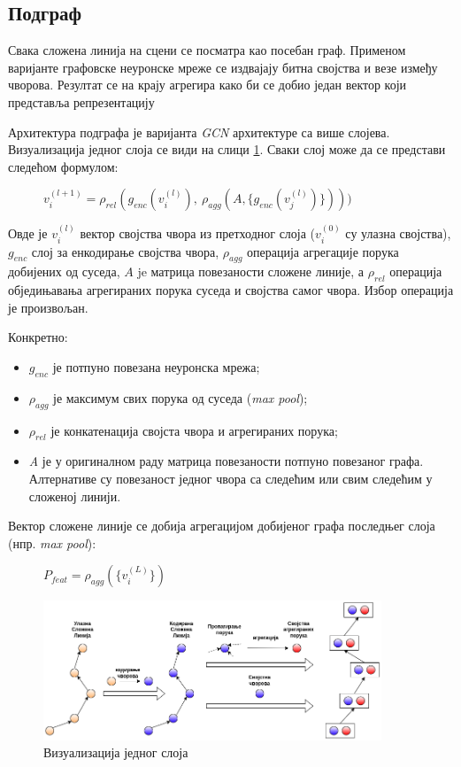 \documentclass[11pt,oneside]{memoir}
\begin{document}
\subsection{Подграф}

Свака сложена линија на сцени се посматра као посебан граф. Применом варијанте графовске неуронске мреже
се издвајају битна својства и везе између чворова. Резултат се на крају агрегира како би се добио један вектор који представља репрезентацију

Архитектура подграфа је варијанта \textit{GCN} архитектуре \cite{gcn} са више слојева. Визуализација једног слоја се види на слици \ref{vectornet-subgraph}. 
Сваки слој може да се представи следећом формулом:

\begin{figure}[H]
  \centering
  $v^{(l+1)}_{i} = \rho_{rel}(g_{enc}(v^{(l)}_{i}),\ \rho_{agg}(A, \{g_{enc}(v^{(l)}_{j})\})))$
\end{figure}

Овде је $v^{(l)}_{i}$ вектор својства чвора из претходног слоја ($v^{(0)}_{i}$ су улазна својства), $g_{enc}$ слој за енкодирање својства чвора, 
$\rho_{agg}$ операција агрегације порука добијених од суседа, $A$ je матрица повезаности сложене линије, 
а $\rho_{rel}$ операција обједињавања агрегираних порука суседа и својства самог чвора. Избор операција је произвољан.

\noindent Конкретно: \cite{vectornet}
\begin{itemize}
  \item $g_{enc}$ је потпуно повезана неуронска мрежа;
  \item $\rho_{agg}$ је максимум свих порука од суседа (\textit{max pool});
  \item $\rho_{rel}$ је конкатенација својста чвора и агрегираних порука;
  \item \textit{A} је у оригиналном раду матрица повезаности потпуно повезаног графа. Алтернативе су повезаност једног чвора са следећим 
  или свим следећим у сложеној линији. 
\end{itemize}

\noindent Вектор сложене линије се добија агрегацијом добијеног графа последњег слоја (нпр. \textit{max pool}):

\begin{figure}[H]
  \centering
  $P_{feat} = \rho_{agg}(\{v^{(L)}_{i}\})$
\end{figure}

\begin{figure}[H]
  \centering
  \includegraphics[width=0.9\textwidth]{images/vectornet-subgraph-rs.drawio.png}
  \caption{Визуализација једног слоја \label{vectornet-subgraph}}
\end{figure}
\end{document}
